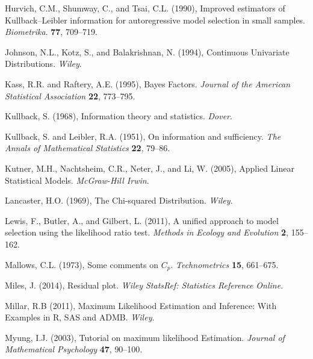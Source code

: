 \phantom{a}

\rff Hurvich, C.M., Shumway, C., and Tsai, C.L. (1990),
      Improved estimators of Kullback–Leibler information for autoregressive model selection in small samples.
      {\it Biometrika}.
      {\bf 77}, {709--719}.

\phantom{a}

\rff Johnson, N.L., Kotz, S., and Balakrishnan, N. (1994),
      Continuous Univariate Distributions.
      {\it Wiley}.

\phantom{a}

\rff Kass, R.R. and Raftery, A.E. (1995),
     Bayes Factors.
     {\it Journal of the American Statistical Association}
     {\bf 22}, {773--795}.

\phantom{a}

\rff Kullback, S. (1968),
      Information theory and statistics.
      {\it Dover}.

\phantom{a}

\rff Kullback, S. and Leibler, R.A. (1951),
     On information and sufficiency.
     {\it The Annals of Mathematical Statistics}
     {\bf 22}, {79--86}.

\phantom{a}

\rff Kutner, M.H., Nachtsheim, C.R., Neter, J., and Li, W. (2005),
      Applied Linear Statistical Models.
      {\it McGraw-Hill Irwin}.

\phantom{a}

\rff Lancaster, H.O. (1969),
      The Chi-squared Distribution.
     {\it Wiley}.

\phantom{a}

\rff Lewis, F., Butler, A., and Gilbert, L. (2011),
      A unified approach to model selection using the likelihood ratio test.
      {\it Methods in Ecology and Evolution}
      {\bf 2}, {155--162}.

\phantom{a}

\rff Mallows, C.L. (1973),
      Some comments on $C_p$.
      {\it Technometrics}
      {\bf 15}, {661--675}.

\phantom{a}

\rff Miles, J. (2014),
      Residual plot.
      {\it Wiley StatsRef: Statistics Reference Online}.      

\phantom{a}

\rff Millar, R.B (2011),
      Maximum Likelihood Estimation and Inference: With Examples in R, SAS and ADMB.
      {\it Wiley}.      

\phantom{a}

\rff Myung, I.J. (2003),
      Tutorial on maximum likelihood Estimation.
      {\it Journal of Mathematical Psychology}
      {\bf 47}, {90--100}.      

